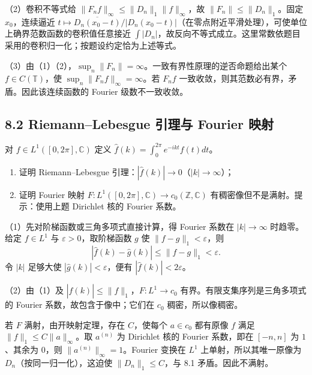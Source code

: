 （2）卷积不等式给
$\|F_nf\|_\infty\le\|D_n\|_1\|f\|_\infty$，故 $\|F_n\|\le\|D_n\|_1$。固定 $x_0$，连续逼近
$t\mapsto\overline{D_n(x_0-t)}/|D_n(x_0-t)|$（在零点附近平滑处理），可使单位上确界范数函数的卷积值任意接近 $\int|D_n|$，故反向不等式成立。这里常数依题目采用的卷积归一化；按题设约定恰为上述等式。

（3）由（1）（2），$\sup_n\|F_n\|=\infty$。一致有界性原理的逆否命题给出某个
$f\in C(\mathbb T)$，使 $\sup_n\|F_nf\|_\infty=\infty$。若 $F_nf$ 一致收敛，则其范数必有界，矛盾。因此该连续函数的 Fourier 级数不一致收敛。

\subsection*{8.2 Riemann--Lebesgue 引理与 Fourier 映射}
\begin{problem}
对 $f\in L^1([0,2\pi],\mathbb C)$ 定义
$\widehat f(k)=\int_0^{2\pi}e^{-ikt}f(t)dt$。
\begin{enumerate}[label=(\arabic*)]
\item 证明 Riemann--Lebesgue 引理：$|\widehat f(k)|\to0$（$|k|\to\infty$）；
\item 证明 Fourier 映射
$F:L^1([0,2\pi],\mathbb C)\to c_0(\mathbb Z,\mathbb C)$ 有稠密像但不是满射。提示：使用上题 Dirichlet 核的 Fourier 系数。
\end{enumerate}
\end{problem}
（1）先对阶梯函数或三角多项式直接计算，得 Fourier 系数在 $|k|\to\infty$ 时趋零。给定
$f\in L^1$ 与 $\varepsilon>0$，取阶梯函数 $g$ 使 $\|f-g\|_1<\varepsilon$，则
\[
|\widehat f(k)-\widehat g(k)|\le\|f-g\|_1<\varepsilon.
\]
令 $|k|$ 足够大使 $|\widehat g(k)|<\varepsilon$，便有 $|\widehat f(k)|<2\varepsilon$。

（2）由（1）及 $|\widehat f(k)|\le\|f\|_1$，$F:L^1\to c_0$ 有界。有限支集序列是三角多项式的 Fourier 系数，故包含于像中；它们在 $c_0$ 稠密，所以像稠密。

若 $F$ 满射，由开映射定理，存在 $C$，使每个 $a\in c_0$ 都有原像 $f$ 满足
$\|f\|_1\le C\|a\|_\infty$。取 $a^{(n)}$ 为 Dirichlet 核的 Fourier 系数，即在 $[-n,n]$ 为 $1$、其余为 $0$，则 $\|a^{(n)}\|_\infty=1$。Fourier 变换在 $L^1$ 上单射，所以其唯一原像为 $D_n$（按同一归一化），这迫使 $\|D_n\|_1\le C$，与 8.1 矛盾。因此不满射。

